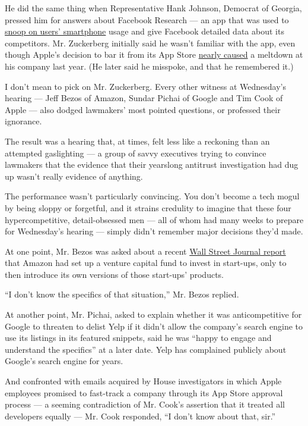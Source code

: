 He did the same thing when Representative Hank Johnson, Democrat of
Georgia, pressed him for answers about Facebook Research --- an app that
was used to
\href{https://www.wired.com/story/facebook-research-app-root-certificate/}{snoop
on users' smartphone} usage and give Facebook detailed data about its
competitors. Mr. Zuckerberg initially said he wasn't familiar with the
app, even though Apple's decision to bar it from its App Store
\href{https://www.nytimes.com/2019/01/31/technology/apple-blocks-facebook.html}{nearly
caused} a meltdown at his company last year. (He later said he misspoke,
and that he remembered it.)

I don't mean to pick on Mr. Zuckerberg. Every other witness at
Wednesday's hearing --- Jeff Bezos of Amazon, Sundar Pichai of Google
and Tim Cook of Apple --- also dodged lawmakers' most pointed questions,
or professed their ignorance.

The result was a hearing that, at times, felt less like a reckoning than
an attempted gaslighting --- a group of savvy executives trying to
convince lawmakers that the evidence that their yearslong antitrust
investigation had dug up wasn't really evidence of anything.

The performance wasn't particularly convincing. You don't become a tech
mogul by being sloppy or forgetful, and it strains credulity to imagine
that these four hypercompetitive, detail-obsessed men --- all of whom
had many weeks to prepare for Wednesday's hearing --- simply didn't
remember major decisions they'd made.

At one point, Mr. Bezos was asked about a recent
\href{https://www.wsj.com/articles/amazon-tech-startup-echo-bezos-alexa-investment-fund-11595520249}{Wall
Street Journal report} that Amazon had set up a venture capital fund to
invest in start-ups, only to then introduce its own versions of those
start-ups' products.

``I don't know the specifics of that situation,'' Mr. Bezos replied.

At another point, Mr. Pichai, asked to explain whether it was
anticompetitive for Google to threaten to delist Yelp if it didn't allow
the company's search engine to use its listings in its featured
snippets, said he was ``happy to engage and understand the specifics''
at a later date. Yelp has complained publicly about Google's search
engine for years.

And confronted with emails acquired by House investigators in which
Apple employees promised to fast-track a company through its App Store
approval process --- a seeming contradiction of Mr. Cook's assertion
that it treated all developers equally --- Mr. Cook responded, ``I don't
know about that, sir.''

